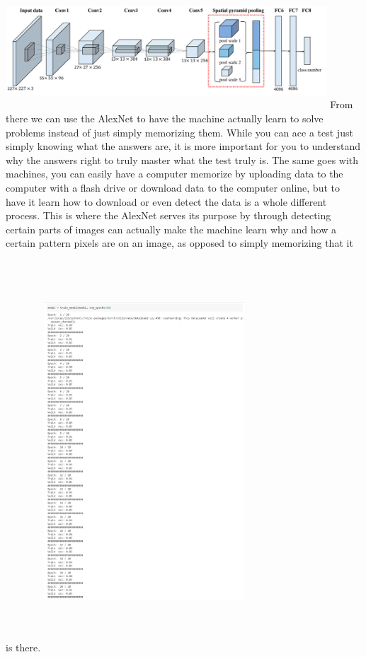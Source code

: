 \includegraphics[height = 4.35cm, width= 12cm]{alexnet2.PNG}
\newline
From there we can use the AlexNet to have the machine actually learn to solve problems instead of just simply memorizing them. While you can ace a test just simply knowing what the answers are, it is more important for you to understand why the answers right to truly master what the test truly is. The same goes with machines, you can easily have a computer memorize by uploading data to the computer with a flash drive or download data to the computer online, but to have it learn how to download or even detect the data is a whole different process. This is where the AlexNet serves its purpose by through detecting certain parts of images can actually make the machine learn why and how a certain pattern pixels are on an image, as opposed to simply memorizing that it is there.
\newline
\newline
\includegraphics[height = 15cm,width=7.5cm]{training.PNG}
\newline


